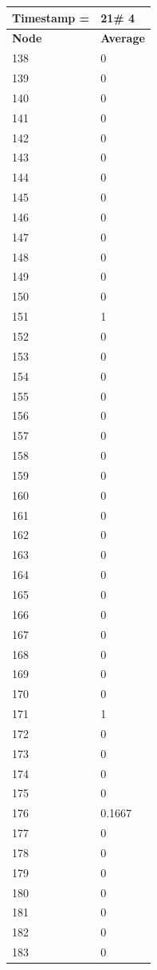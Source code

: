 \begin{tabular}{|l||l|}
\hline
\textbf{Timestamp =} & \textbf{21}\# 4\\\hline
	\textbf{Node} & \textbf{Average} \\ \hline
\hline
	138 & 0 \\ \hline
	139 & 0 \\ \hline
	140 & 0 \\ \hline
	141 & 0 \\ \hline
	142 & 0 \\ \hline
	143 & 0 \\ \hline
	144 & 0 \\ \hline
	145 & 0 \\ \hline
	146 & 0 \\ \hline
	147 & 0 \\ \hline
	148 & 0 \\ \hline
	149 & 0 \\ \hline
	150 & 0 \\ \hline
	151 & 1 \\ \hline
	152 & 0 \\ \hline
	153 & 0 \\ \hline
	154 & 0 \\ \hline
	155 & 0 \\ \hline
	156 & 0 \\ \hline
	157 & 0 \\ \hline
	158 & 0 \\ \hline
	159 & 0 \\ \hline
	160 & 0 \\ \hline
	161 & 0 \\ \hline
	162 & 0 \\ \hline
	163 & 0 \\ \hline
	164 & 0 \\ \hline
	165 & 0 \\ \hline
	166 & 0 \\ \hline
	167 & 0 \\ \hline
	168 & 0 \\ \hline
	169 & 0 \\ \hline
	170 & 0 \\ \hline
	171 & 1 \\ \hline
	172 & 0 \\ \hline
	173 & 0 \\ \hline
	174 & 0 \\ \hline
	175 & 0 \\ \hline
	176 & 0.1667 \\ \hline
	177 & 0 \\ \hline
	178 & 0 \\ \hline
	179 & 0 \\ \hline
	180 & 0 \\ \hline
	181 & 0 \\ \hline
	182 & 0 \\ \hline
	183 & 0 \\ \hline
\end{tabular}
